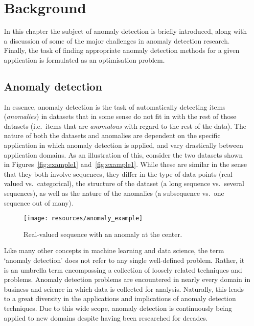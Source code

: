 \chapter{Background}
\label{ch:background}

In this chapter the subject of anomaly detection is briefly introduced, along with a discussion of some of the major challenges in anomaly detection research. Finally, the task of finding appropriate anomaly detection methods for a given application is formulated as an optimisation problem.

\section{Anomaly detection}
\label{sect:adb}

In essence, anomaly detection is the task of automatically detecting items (\emph{anomalies}) in datasets that in some sense do not fit in with the rest of those datasets (i.e.\ items that are \emph{anomalous} with regard to the rest of the data). The nature of both the datasets and anomalies are dependent on the specific application in which anomaly detection is applied, and vary drastically between application domains. As an illustration of this, consider the two datasets shown in Figures~\ref{fig:example1} and~\ref{fig:example1}. While these are similar in the sense that they both involve sequences, they differ in the type of data points (real-valued vs.\ categorical), the structure of the dataset (a long sequence vs.\ several sequences), as well as the nature of the anomalies (a subsequence vs.\ one sequence out of many).

\begin{figure}[htb]
    \centering
    \texttt{[image: resources/anomaly\_example]}
    \caption{\small Real-valued sequence with an anomaly at the center.}
    \vspace{-0pt}
\label{fig:example2}
\end{figure}

Like many other concepts in machine learning and data science, the term `anomaly detection' does not refer to any single well-defined problem. Rather, it is an umbrella term encompassing a collection of loosely related techniques and problems. Anomaly detection problems are encountered in nearly every domain in business and science in which data is collected for analysis. Naturally, this leads to a great diversity in the applications and implications of anomaly detection techniques. Due to this wide scope, anomaly detection is continuously being applied to new domains despite having been researched for decades.

